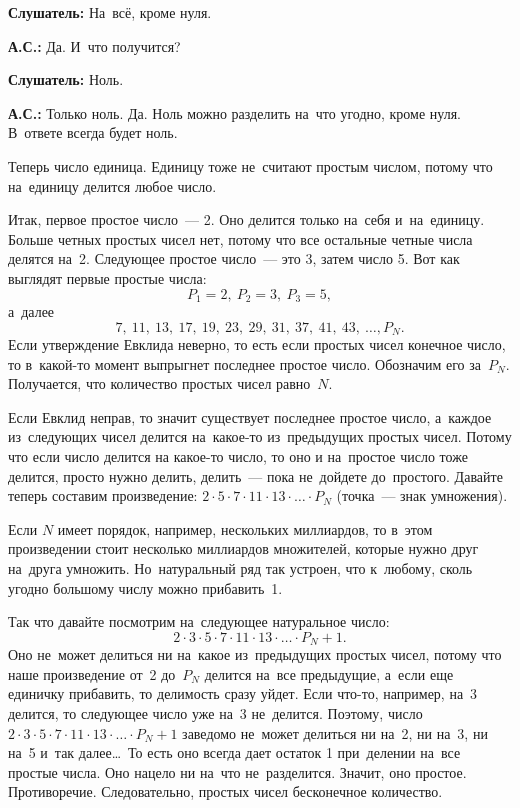 \textbf{Слушатель:} На~всё, кроме нуля.

\textbf{А.С.:} Да. И~что получится?

\textbf{Слушатель:} Ноль.

\textbf{А.С.:} Только ноль. Да. Ноль можно разделить на~что угодно, кроме нуля. В~ответе всегда
будет ноль.

Теперь число единица. Единицу тоже не~считают простым числом, потому что на~единицу делится любое
число.


Итак, первое простое число~--- 2. Оно делится только на~себя и~на~единицу. Больше четных простых
чисел нет, потому что все остальные четные числа делятся на~2. Следующее простое число~--- это 3, затем число 5. Вот
как выглядят первые простые числа:
$$
P_{1}=2,\
P_{2}=3,\
P_{3}=5,
$$
а~далее
$$
7,\ 11,\ 13,\ 17,\ 19,\ 23,\ 29,\ 31,\ 37,\ 41,\ 43,\ \ldots,
P_{N}.
$$
Если утверждение Евклида неверно, то есть если простых чисел конечное число, то в~какой-то момент
выпрыгнет последнее простое число. Обозначим его за~$P_{N}$. Получается, что количество простых чисел равно~$N$.


Если Евклид неправ, то значит существует последнее простое число, а~каждое из~следующих чисел делится
на~какое-то из~предыдущих простых чисел. Потому что если число делится на какое-то число, то оно и на~простое
число тоже делится, просто нужно делить, делить~--- пока не~дойдете до~простого. Давайте теперь составим
произведение: $2\cdot5\cdot7\cdot11\cdot13\cdot\ldots\cdot P_{N}$ (точка~--- знак умножения).

Если $N$ имеет порядок, например, нескольких миллиардов, то в~этом произведении стоит несколько
миллиардов множителей, которые нужно друг на~друга умножить. Но~натуральный ряд так устроен, что
к~любому, сколь угодно большому числу можно прибавить~1.

Так что давайте посмотрим на~следующее натуральное число:
$$
2\cdot3\cdot5\cdot7\cdot11\cdot13\cdot\ldots\cdot P_{N}+1.
$$
Оно не~может делиться ни на~какое из~предыдущих простых чисел, потому что наше произведение от~2
до~$P_{N}$ делится на~все предыдущие, а~если еще единичку прибавить, то делимость сразу уйдет. Если
что-то, например, на~3 делится, то следующее число уже на~3 не~делится. Поэтому, число $2\cdot3\cdot5\cdot7\cdot11\cdot13\cdot\ldots\cdot P_{N}+1$
заведомо не~может делиться ни на~2, ни на~3, ни на~5 и~так далее\ldots\ То
есть оно всегда дает остаток 1 при~делении на~все простые числа. Оно нацело ни на~что не~разделится.
Значит, оно простое. Противоречие. Следовательно, простых чисел бесконечное количество.

